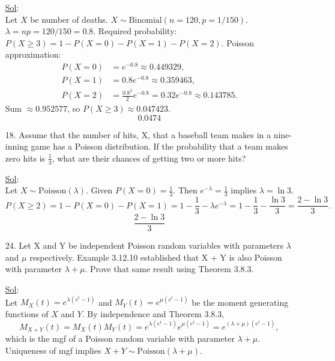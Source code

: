 \begin{enumerate}
	      \underline{Sol}: \\

	      Let \(X\) be number of deaths. \(X \sim \mathrm{Binomial}(n=120, p=1/150)\).
	      \(\lambda = np = 120/150 = 0.8\).
	      Required probability: \(P(X \ge 3) = 1 - P(X=0) - P(X=1) - P(X=2)\).
	      Poisson approximation:
	      \begin{align*}
		      P(X=0) & = e^{-0.8} \approx 0.449329,                                 \\
		      P(X=1) & = 0.8 e^{-0.8} \approx 0.359463,                             \\
		      P(X=2) & = \frac{0.8^2}{2} e^{-0.8} = 0.32 e^{-0.8} \approx 0.143785.
	      \end{align*}
	      Sum \(\approx 0.952577\), so \(P(X \ge 3) \approx 0.047423\).
	      \[
		      \boxed{0.0474}
	      \]

	\item[18.] Assume that the number of hits, X, that a baseball team makes in a nine-inning game has a Poisson distribution. If the probability that a team makes zero hits is \(\frac13\), what are their chances of getting two or more hits?

	      \underline{Sol}: \\

	      Let \(X \sim \text{Poisson}(\lambda)\). Given \(P(X=0) = \frac13\). Then \(e^{-\lambda} = \frac13\) implies \(\lambda = \ln 3\).
	      \[
		      P(X \ge 2) = 1 - P(X=0) - P(X=1) = 1 - \frac13 - \lambda e^{-\lambda} = 1 - \frac13 - \frac{\ln 3}{3} = \frac{2 - \ln 3}{3}.
	      \]
	      \[
		      \boxed{\dfrac{2 - \ln 3}{3}}
	      \]

	\item[24.] Let X and Y be independent Poisson random variables with parameters \(\lambda\) and \(\mu\) respectively. Example 3.12.10 established that X + Y  is also Poisson with parameter \(\lambda + \mu\). Prove that same result using Theorem 3.8.3.

	      \underline{Sol}: \\

	      Let \(M_X(t) = e^{\lambda(e^t - 1)}\) and \(M_Y(t) = e^{\mu(e^t - 1)}\) be the moment generating functions of \(X\) and \(Y\). By independence and Theorem 3.8.3,
	      \[
		      M_{X+Y}(t) = M_X(t) M_Y(t) = e^{\lambda(e^t - 1)} e^{\mu(e^t - 1)} = e^{(\lambda+\mu)(e^t - 1)},
	      \]
	      which is the mgf of a Poisson random variable with parameter \(\lambda+\mu\). Uniqueness of mgf implies \(X+Y \sim \text{Poisson}(\lambda+\mu)\).


\end{enumerate}
